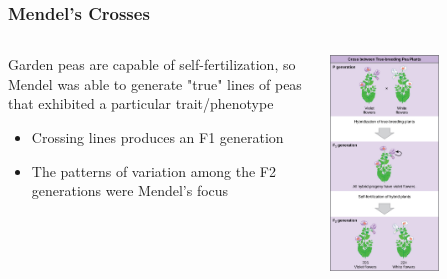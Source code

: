 \documentclass{beamer}
\begin{document}
\begin{frame}
	
	\frametitle{Mendel's Crosses}

	
\begin{columns}
	\begin{column}{0.5\textwidth}
			Garden peas are capable of self-fertilization, so Mendel was able to generate "true" lines of peas that exhibited a particular trait/phenotype
		\begin{itemize}
	\item	Crossing lines produces an F1 generation 	
	\item 	The patterns of variation among the F2 generations were Mendel's focus
		\end{itemize}
		


	\end{column}
	\begin{column}{0.6\textwidth}  
\begin{center}
			\includegraphics[keepaspectratio, width  =0.6\textwidth]{img/mendelCross_1}
\end{center}
\end{column}
\end{columns}
\end{frame}
\end{document}
